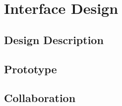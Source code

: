 \chapter{Interface Design}


\section{Design Description}


\section{Prototype}


\section{Collaboration}



